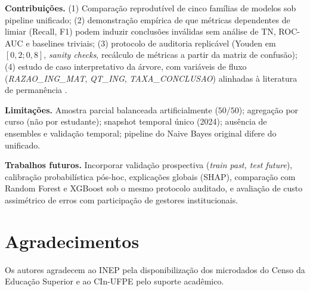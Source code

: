 \documentclass[conference]{IEEEtran}
\begin{document}
\textbf{Contribuições.} (1) Comparação reprodutível de cinco famílias de modelos sob pipeline unificado; (2) demonstração empírica de que métricas dependentes de limiar (Recall, F1) podem induzir conclusões inválidas sem análise de TN, ROC-AUC e baselines triviais; (3) protocolo de auditoria replicável (Youden em $[0{,}2; 0{,}8]$, \textit{sanity checks}, recálculo de métricas a partir da matriz de confusão); (4) estudo de caso interpretativo da árvore, com variáveis de fluxo (\textit{RAZAO\_ING\_MAT}, \textit{QT\_ING}, \textit{TAXA\_CONCLUSAO}) alinhadas à literatura de permanência \cite{tinto2010}.

\textbf{Limitações.} Amostra parcial balanceada artificialmente ($50/50$); agregação por curso (não por estudante); snapshot temporal único (2024); ausência de ensembles e validação temporal; pipeline do Naive Bayes original difere do unificado.

\textbf{Trabalhos futuros.} Incorporar validação prospectiva (\textit{train past, test future}), calibração probabilística pós-hoc, explicações globais (SHAP), comparação com Random Forest e XGBoost sob o mesmo protocolo auditado, e avaliação de custo assimétrico de erros com participação de gestores institucionais.

\section*{Agradecimentos}

Os autores agradecem ao INEP pela disponibilização dos microdados do Censo da Educação Superior e ao CIn-UFPE pelo suporte acadêmico.
\end{document}
